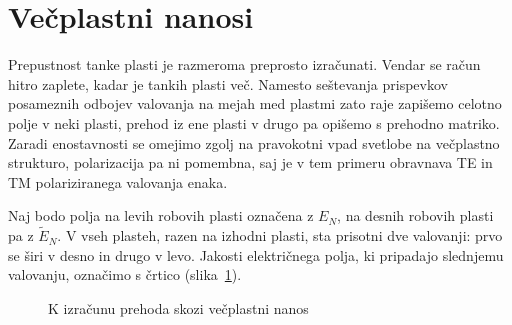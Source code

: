 \section{Večplastni nanosi}
Prepustnost tanke plasti je razmeroma preprosto izračunati. Vendar se račun hitro
zaplete, kadar je tankih plasti več. Namesto seštevanja prispevkov 
posameznih odbojev valovanja na mejah med plastmi zato raje zapišemo celotno polje 
v neki plasti, prehod iz ene plasti v drugo pa opišemo s prehodno matriko.
Zaradi enostavnosti se omejimo zgolj na pravokotni 
vpad svetlobe na večplastno strukturo, polarizacija pa ni pomembna, saj 
je v tem primeru obravnava TE in TM polariziranega valovanja enaka.

Naj bodo polja na levih 
robovih plasti označena z $E_N$, na desnih robovih plasti pa z $\tilde{E}_N$. 
V vseh plasteh, razen na izhodni plasti, sta prisotni dve valovanji: prvo se širi
v desno in drugo v levo. Jakosti električnega polja, ki pripadajo slednjemu
valovanju, označimo s črtico (slika~\ref{fig:06_prehodneM}).
\begin{figure}[ht]
\centering
\def\svgwidth{100truemm} 

\caption{K izračunu prehoda skozi večplastni nanos}
\label{fig:06_prehodneM}
\end{figure}

